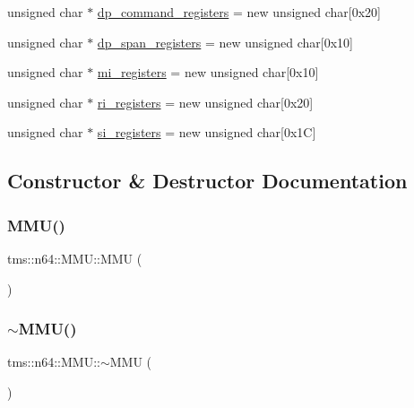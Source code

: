 \begin{DoxyCompactItemize}
\item 
unsigned char $\ast$ \hyperlink{classtms_1_1n64_1_1_m_m_u_a41a43264e91f083835c5ac9b1639d7f0}{dp\+\_\+command\+\_\+registers} = new unsigned char\mbox{[}0x20\mbox{]}
\item 
unsigned char $\ast$ \hyperlink{classtms_1_1n64_1_1_m_m_u_ad9710c16cde253c4866de443f350dad5}{dp\+\_\+span\+\_\+registers} = new unsigned char\mbox{[}0x10\mbox{]}
\item 
unsigned char $\ast$ \hyperlink{classtms_1_1n64_1_1_m_m_u_ab46f10b95d4cf9d098d95ccf3c39aa4a}{mi\+\_\+registers} = new unsigned char\mbox{[}0x10\mbox{]}
\item 
unsigned char $\ast$ \hyperlink{classtms_1_1n64_1_1_m_m_u_affa56cdf3c73c6c6b8dd447f8cdb3191}{ri\+\_\+registers} = new unsigned char\mbox{[}0x20\mbox{]}
\item 
unsigned char $\ast$ \hyperlink{classtms_1_1n64_1_1_m_m_u_a368fa7179ad311c991097fbc07b62836}{si\+\_\+registers} = new unsigned char\mbox{[}0x1\+C\mbox{]}
\end{DoxyCompactItemize}


\subsection{Constructor \& Destructor Documentation}
\mbox{\label{classtms_1_1n64_1_1_m_m_u_afffbe775b2f0c1611056bea40b6822fc}} 
\subsubsection{\texorpdfstring{M\+M\+U()}{MMU()}}
{\footnotesize\ttfamily tms\+::n64\+::\+M\+M\+U\+::\+M\+MU (\begin{DoxyParamCaption}{ }\end{DoxyParamCaption})}

\mbox{\label{classtms_1_1n64_1_1_m_m_u_a699238b91cdad78dd343d3c4b321b41a}} 
\subsubsection{\texorpdfstring{$\sim$\+M\+M\+U()}{~MMU()}}
{\footnotesize\ttfamily tms\+::n64\+::\+M\+M\+U\+::$\sim$\+M\+MU (\begin{DoxyParamCaption}{ }\end{DoxyParamCaption})}



